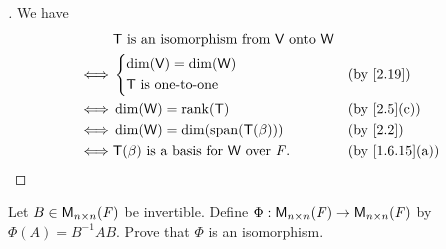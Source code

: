 \begin{proof}[]
  We have
  \begin{align*}
         & \T \text{ is an isomorphism from } \V \text{ onto } \W                                   \\
    \iff & \begin{dcases}
             \dim(\V) = \dim(\W) \\
             \T \text{ is one-to-one}
           \end{dcases}                               &  & \text{(by \cref{2.19})}                  \\
    \iff & \dim(\W) = \rk{\T}                                     &  & \text{(by \cref{2.5}(c))}    \\
    \iff & \dim(\W) = \dim(\spn{\T(\beta)})                       &  & \text{(by \cref{2.2})}       \\
    \iff & \T(\beta) \text{ is a basis for } \W \text{ over } \F. &  & \text{(by \cref{1.6.15}(a))}
  \end{align*}
\end{proof}

\begin{ex}\label{ex:2.4.16}
  Let \(B \in \mathsf{M}_{{n} \times n}({\mathit{F}})\) be invertible.
  Define \(\Phi : \mathsf{M}_{{n} \times n}({\mathit{F}}) \to \mathsf{M}_{{n} \times n}({\mathit{F}})\) by \(\Phi(A) = B^{-1} AB\).
  Prove that \(\Phi\) is an isomorphism.
\end{ex}

